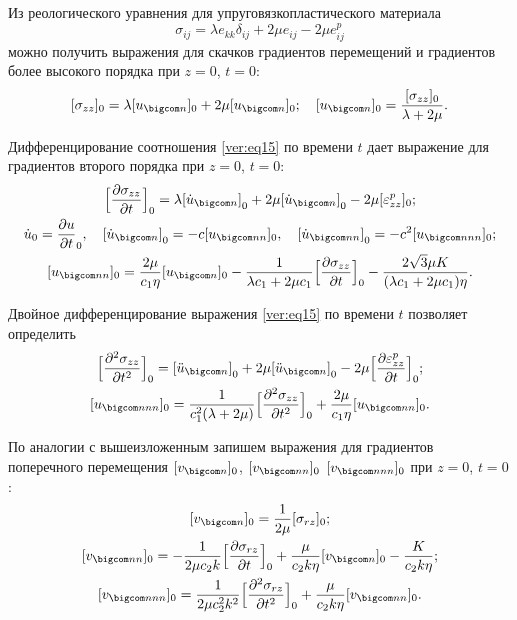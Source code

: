 Из реологического уравнения для упруговязкопластического материала
\begin{equation}
\label{ver:eq15}
\sigma_{ij}=\lambda e_{kk} \delta_{ij}+2\mu e_{ij}-2\mu e_{ij}^p
\end{equation}
можно получить выражения для скачков градиентов перемещений и градиентов более высокого порядка при $z=0$, $t=0$:
\begin{equation}
\label{ver:eq16}
[\sigma_{zz}]_0=\lambda[u_{\bigcom n}]_0+2\mu [u_{\bigcom n}]_0; \quad [u_{\bigcom n}]_0=\frac{[\sigma_{zz}]_0}{\lambda+2\mu}.
\end{equation}

Дифференцирование соотношения \eqref{ver:eq15} по времени $t$ дает выражение для градиентов второго порядка при $z=0$, $t=0$: 
\begin{gather}
\label{ver:eq17}
\Bigl[\frac{\partial\sigma_{zz}}{\partial t}\Bigr]_0=\lambda {[\dot u_{\bigcom n}]}_0+2\mu {[ \dot u_{\bigcom n}]}_0-2\mu[\varepsilon_{zz}^p]_0;
\\
\label{ver:eq18}
\dot{u}_0=\frac{\partial u}{\partial t}_{0}, \quad 
{[\dot u_{\bigcom n}]}_0=-c[u_{\bigcom nn}]_0, \quad 
{[\dot u_{\bigcom nn}]}_0=-c^2[u_{\bigcom nnn}]_0;
\\
\label{ver:eq19}
[u_{\bigcom nn}]_0=\frac{2\mu}{c_1\eta}[u_{\bigcom n}]_0-\frac{1}{\lambda c_1+2\mu c_1}\Bigl[\frac{\partial\sigma_{zz}}{\partial t}\Bigr]_0-\frac{2\sqrt{3}\mu K}{(\lambda c_1+2\mu c_1)\eta}.
\end{gather}


Двойное дифференцирование выражения \eqref{ver:eq15} по времени $t$ позволяет определить
\begin{gather}
\label{ver:eq20}
\Bigl[\frac{\partial^2\sigma_{zz}}{\partial t^2}\Bigr]_0=
{[ \ddot u_{\bigcom n}]}_0+2\mu{[\ddot u_{\bigcom n}]}_0-2\mu\Bigl[\frac{\partial\varepsilon_{zz}^p}{\partial t}\Bigr]_0;
\\
\label{ver:eq_{21}}
[u_{\bigcom nnn}]_0=\frac{1}{c_1^2(\lambda+2\mu)} 
\Bigl[\frac{\partial^2\sigma_{zz}}{\partial t^2}\Bigr]_0+\frac{2\mu}{c_1\eta}[u_{\bigcom nn}]_0.
\end{gather}

По аналогии с вышеизложенным запишем выражения для градиентов поперечного перемещения $[v_{\bigcom n}]_0$, $[v_{\bigcom nn}]_0$ $[v_{\bigcom nnn}]_0$ при $z=0$, $t=0$:
\begin{gather}
\label{ver:eq22}
[v_{\bigcom n}]_0=\frac1{2\mu}{[\sigma_{rz}]_0};
\\
\label{ver:eq23}
[v_{\bigcom nn}]_0=-\frac{1}{2\mu c_2 k}\Bigl[\frac{\partial\sigma_{rz}}{\partial t}\Bigr]_0+\frac{\mu}{c_2k\eta}[v_{\bigcom n}]_0-\frac{K}{c_2k\eta};
\\
\label{ver:eq24}
[v_{\bigcom nnn}]_0=\frac{1}{2\mu c_2^2k^2}\Bigl[\frac{\partial^2\sigma_{rz}}{\partial t^2}\Bigr]_0+\frac{\mu}{c_2k\eta}[v_{\bigcom nn}]_0.
\end{gather}

